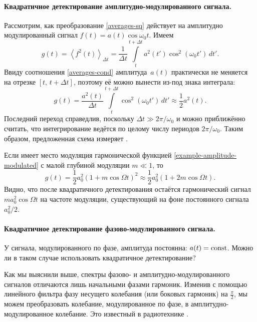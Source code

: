 \paragraph{Квадратичное детектирование амплитудно-модулированного сигнала.}
Рассмотрим, как преобразование \eqref{averages-sq} действует на
амплитудно модулированный сигнал $f(t) = a(t) \cos \omega_0 t$. Имеем
\begin{equation*}
 g(t) = \left<f^2(t)\right>_{\Delta t} =
 \frac{1}{\Delta t}
\int\limits_{t}^{t+\Delta t} a^2 (t') \cos^2(\omega_0 t')\,dt'.
\end{equation*}
Ввиду соотношения \eqref{averages-cond} амплитуда~$a(t)$ практически не меняется
на отрезке $[t,\,t+\Delta t]$, поэтому её можно вынести из-под знака интеграла:
\begin{equation}
 g(t)= \frac{a^2(t)}{\Delta t} \int\limits_{t}^{t+\Delta t} \cos^2(\omega_0 t')\,dt'\approx
 \frac12 a^2(t).
\end{equation}
Последний переход справедлив, поскольку $\Delta t \gg 2\pi/\omega_0$ и
можно приближённо считать, что интегрирование ведётся по целому числу периодов
$2\pi /\omega_0$.
Таким образом, предложенная схема измеряет .

Если имеет место модуляция гармонической функцией
\eqref{example-amplitude-modulated}
с малой глубиной модуляции $m\ll 1$, то
\begin{equation*}
 g(t) = \frac12 a_0^2 (1+m\cos\Omega t)^2 \approx
 \frac12 a_0^2 (1+2m\cos\Omega t).
\end{equation*}
Видно, что после квадратичного детектирования остаётся гармонический
сигнал $m a_0^2 \cos\Omega t$ на частоте модуляции, существующий на фоне
постоянного сигнала $a_0^2/2$.

\paragraph{Квадратичное детектирование фазово-модулированного сигнала.}
У сигнала, модулированного по фазе, амплитуда постоянна: $a(t)=\mathrm{const}$.
Можно ли в таком случае использовать квадратичное детектирование?

Как мы выяснили выше, спектры фазово- и амплитудно-модулированного сигналов
отличаются лишь начальными фазами гармоник. Изменив с помощью линейного фильтра
фазу несущего колебания (или боковых гармоник) на $\frac{\pi}{2}$,
мы можем преобразовать колебание, модулированное по фазе,
в амплитудно-модулированное колебание. Это известный в
радиотехнике .

